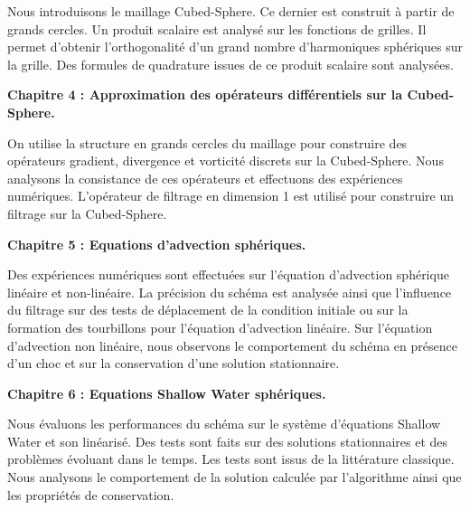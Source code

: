 Nous introduisons le maillage Cubed-Sphere. Ce dernier est construit à partir de grands cercles. Un produit scalaire est analysé sur les fonctions de grilles. Il permet d'obtenir l'orthogonalité d'un grand nombre d'harmoniques sphériques sur la grille. Des formules de quadrature issues de ce produit scalaire sont analysées.






\vspace{0.7cm}
\textbf{Chapitre 4 : Approximation des opérateurs différentiels sur la Cubed-Sphere.}

On utilise la structure en grands cercles du maillage pour construire des opérateurs gradient, divergence et vorticité discrets sur la Cubed-Sphere. Nous analysons la consistance de ces opérateurs et effectuons des expériences numériques. L'opérateur de filtrage en dimension 1 est utilisé pour construire un filtrage sur la Cubed-Sphere.







\vspace{0.7cm}
\textbf{Chapitre 5 : Equations d'advection sphériques.}

Des expériences numériques sont effectuées sur l'équation d'advection sphérique linéaire et non-linéaire. La précision du schéma est analysée ainsi que l'influence du filtrage sur des tests de déplacement de la condition initiale ou sur la formation des tourbillons pour l'équation d'advection linéaire. Sur l'équation d'advection non linéaire, nous observons le comportement du schéma en présence d'un choc et sur la conservation d'une solution stationnaire.  







\vspace{0.7cm}
\textbf{Chapitre 6 : Equations Shallow Water sphériques.}

Nous évaluons les performances du schéma sur le système d'équations Shallow Water et son linéarisé. Des tests sont faits sur des solutions stationnaires et des problèmes évoluant dans le temps. Les tests sont issus de la littérature classique. Nous analysons le comportement de la solution calculée par l'algorithme ainsi que les propriétés de conservation.

